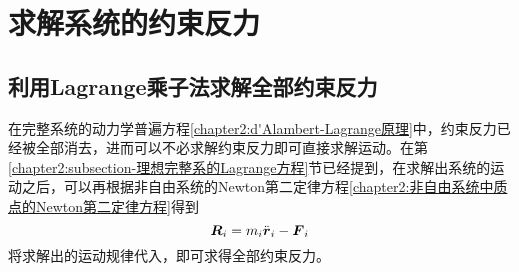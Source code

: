 \section{求解系统的约束反力}

\subsection{利用Lagrange乘子法求解全部约束反力}

在完整系统的动力学普遍方程\eqref{chapter2:d'Alambert-Lagrange原理}中，约束反力已经被全部消去，进而可以不必求解约束反力即可直接求解运动。在第\ref{chapter2:subsection-理想完整系的Lagrange方程}节已经提到，在求解出系统的运动之后，可以再根据非自由系统的Newton第二定律方程\eqref{chapter2:非自由系统中质点的Newton第二定律方程}得到
\begin{equation}
	\boldsymbol{R}_i = m_i\ddot{\boldsymbol{r}}_i-\boldsymbol{F}_i
	\label{chapter2:求解全部约束反力-约束反力的定义}
\end{equation}
将求解出的运动规律代入，即可求得全部约束反力。


